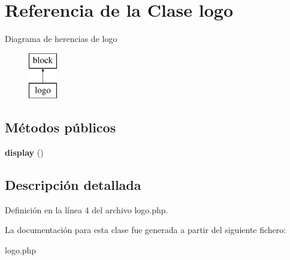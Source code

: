 \hypertarget{classlogo}{\section{\-Referencia de la \-Clase logo}
\label{classlogo}
}
\-Diagrama de herencias de logo\begin{figure}[H]
\begin{center}
\leavevmode
\includegraphics[height=2.000000cm]{classlogo}
\end{center}
\end{figure}
\subsection*{\-Métodos públicos}
\begin{DoxyCompactItemize}
\item 
\hypertarget{classlogo_a5dbc2e33bf0508b4ce4833f2799c1b99}{{\bfseries display} ()}\label{classlogo_a5dbc2e33bf0508b4ce4833f2799c1b99}

\end{DoxyCompactItemize}


\subsection{\-Descripción detallada}


\-Definición en la línea 4 del archivo logo.\-php.



\-La documentación para esta clase fue generada a partir del siguiente fichero\-:\begin{DoxyCompactItemize}
\item 
logo.\-php\end{DoxyCompactItemize}
